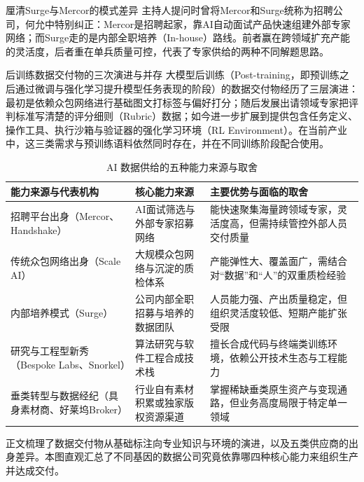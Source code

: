 \documentclass[UTF8,a4paper,11pt,fontset=fandol]{ctexart}
\begin{document}
\begin{importantbox}{厘清Surge与Mercor的模式差异}
主持人提问时曾将Mercor和Surge统称为招聘公司，何允中特别纠正：Mercor是招聘起家，靠AI自动面试产品快速组建外部专家网络；而Surge走的是内部全职培养（In-house）路线。前者赢在跨领域扩充产能的灵活度，后者重在单兵质量可控，代表了专家供给的两种不同解题思路。
\end{importantbox}
\begin{knowledgebox}{后训练数据交付物的三次演进与并存}
大模型后训练（Post-training，即预训练之后通过微调与强化学习提升模型任务表现的阶段）的数据交付物经历了三层演进：最初是依赖众包网络进行基础图文打标签与偏好打分；随后发展出请领域专家把评判标准写清楚的评分细则（Rubric）数据；如今进一步扩展到提供包含任务定义、操作工具、执行沙箱与验证器的强化学习环境（RL Environment）。在当前产业中，这三类需求与预训练语料依然同时存在，并在不同训练阶段配合使用。
\end{knowledgebox}
\begin{table}[H]\centering\small
\caption{AI 数据供给的五种能力来源与取舍}
\begin{tabular}{>{\raggedright\arraybackslash}p{\dimexpr(\linewidth-6\tabcolsep)/3\relax}>{\raggedright\arraybackslash}p{\dimexpr(\linewidth-6\tabcolsep)/3\relax}>{\raggedright\arraybackslash}p{\dimexpr(\linewidth-6\tabcolsep)/3\relax}}
\toprule
能力来源与代表机构 & 核心能力来源 & 主要优势与面临的取舍\\\midrule
招聘平台出身（Mercor、Handshake） & AI面试筛选与外部专家招募网络 & 能快速聚集海量跨领域专家，灵活度高，但需持续管控外部人员交付质量\\[4pt]
传统众包网络出身（Scale AI） & 大规模众包网络与沉淀的质检体系 & 产能弹性大、覆盖面广，需结合对“数据”和“人”的双重质检经验\\[4pt]
内部培养模式（Surge） & 公司内部全职招募与培养的数据团队 & 人员能力强、产出质量稳定，但组织灵活度较低、短期产能扩张受限\\[4pt]
研究与工程型新秀（Bespoke Labs、Snorkel） & 算法研究与软件工程合成技术栈 & 擅长合成代码与终端类训练环境，依赖公开技术生态与工程能力\\[4pt]
垂类转型与数据经纪（具身素材商、好莱坞Broker） & 行业自有素材积累或独家版权资源渠道 & 掌握稀缺垂类原生资产与变现通路，但业务高度局限于特定单一领域\\[4pt]
\bottomrule\end{tabular}\end{table}
正文梳理了数据交付物从基础标注向专业知识与环境的演进，以及五类供应商的出身差异。本图直观汇总了不同基因的数据公司究竟依靠哪四种核心能力来组织生产并达成交付。
\end{document}
